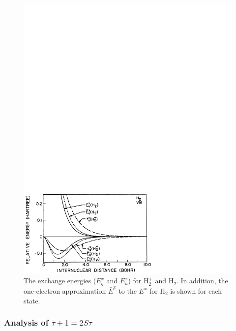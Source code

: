 \begin{figure}
\includegraphics[scale=0.75]{fig2-32}
\caption{The exchange energies ($E_g^x$ and $E_u^x$) for H$_2^+$ and
  H$_2$. In addition, the one-electron approximation $\bar{E}^x$ to
  the $E^x$ for H$_2$ is shown for each state.}
\label{fig2-32}
\end{figure}

\subsubsection{Analysis of ${\bar{\tau}}+1 = 2S \tau$}

